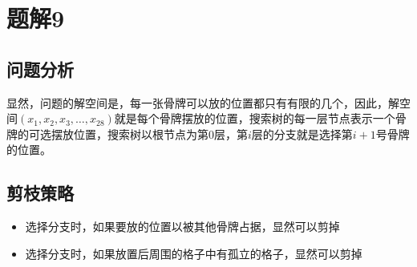 \section{题解9}
\subsection{问题分析}
显然，问题的解空间是，每一张骨牌可以放的位置都只有有限的几个，因此，解空间$(x_1,x_2,x_3,\dots,x_28)$就是每个骨牌摆放的位置，搜索树的每一层节点表示一个骨牌的可选摆放位置，搜索树以根节点为第$0$层，第$i$层的分支就是选择第$i+1$号骨牌的位置。

\subsection{剪枝策略}
\begin{itemize}
    \item 选择分支时，如果要放的位置以被其他骨牌占据，显然可以剪掉
    \item 选择分支时，如果放置后周围的格子中有孤立的格子，显然可以剪掉
\end{itemize}